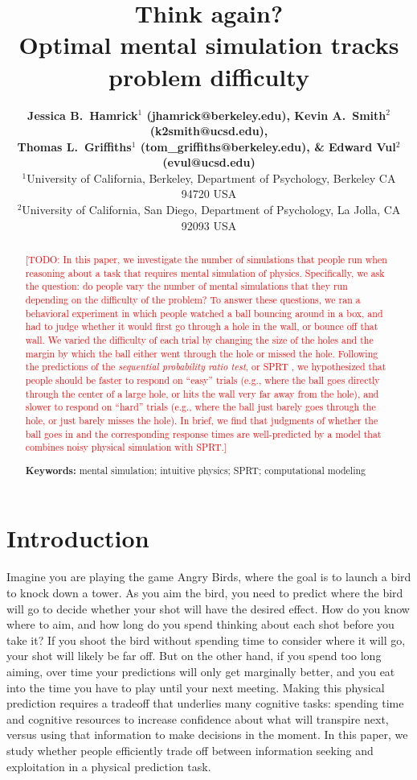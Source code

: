 \documentclass[10pt,letterpaper]{article}
\title{Think again?\\ Optimal mental simulation tracks problem difficulty}
\author{{\large \bf Jessica B.~Hamrick$^1$ (jhamrick@berkeley.edu),
    Kevin A.~Smith$^2$ (k2smith@ucsd.edu),}\\
    {\large \bf Thomas L.~Griffiths$^1$ (tom\_griffiths@berkeley.edu),
      \& Edward Vul$^2$ (evul@ucsd.edu)}\\
    $^1$University of California, Berkeley, Department of Psychology, Berkeley CA 94720 USA\\
    $^2$University of California, San Diego, Department of Psychology, La Jolla, CA 92093 USA}
\newcommand{\TODO}[1]{\textcolor{red}{[TODO: #1]}}
\begin{document}
\maketitle

\begin{abstract}
\TODO{In this paper, we investigate the number of simulations that people run when reasoning about a task that requires mental simulation of physics. 
Specifically, we ask the question: do people vary the number of mental simulations that they run depending on the difficulty of the problem?
To answer these questions, we ran a behavioral experiment in which people watched a ball bouncing around in a box, and had to judge whether it would first go through a hole in the wall, or bounce off that wall. 
We varied the difficulty of each trial by changing the size of the holes and the margin by which the ball either went through the hole or missed the hole. 
Following the predictions of the \emph{sequential probability ratio test}, or SPRT \cite{wald1947sequential}, we hypothesized that people should be faster to respond on ``easy'' trials (e.g., where the ball goes directly through the center of a large hole, or hits the wall very far away from the hole), and slower to respond on ``hard'' trials (e.g., where the ball just barely goes through the hole, or just barely misses the hole). 
In brief, we find that judgments of whether the ball goes in and the corresponding response times are well-predicted by a model that combines noisy physical simulation with SPRT.}

\textbf{Keywords:} 
mental simulation; intuitive physics; SPRT; computational modeling
\end{abstract}

\section{Introduction}

Imagine you are playing the game Angry Birds, where the goal is to launch a bird to knock down a tower. 
As you aim the bird, you need to predict where the bird will go to decide whether your shot will have the desired effect. 
How do you know where to aim, and how long do you spend thinking about each shot before you take it? 
If you shoot the bird without spending time to consider where it will go, your shot will likely be far off. 
But on the other hand, if you spend too long aiming, over time your predictions will only get marginally better, and you eat into the time you have to play until your next meeting. 
Making this physical prediction requires a tradeoff that underlies many cognitive tasks: spending time and cognitive resources to increase confidence about what will transpire next, versus using that information to make decisions in the moment. 
In this paper, we study whether people efficiently trade off between information seeking and exploitation in a physical prediction task.
\end{document}
